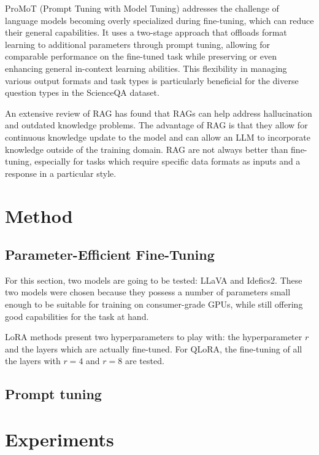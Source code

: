 \documentclass{article}
\begin{document}
ProMoT (Prompt Tuning with Model Tuning) \cite{valizadehaslani2022twostagefinetuningnovelstrategy} addresses the challenge of language models becoming overly specialized during fine-tuning, which can reduce their general capabilities. It uses a two-stage approach that offloads format learning to additional parameters through prompt tuning, allowing for comparable performance on the fine-tuned task while preserving or even enhancing general in-context learning abilities. This flexibility in managing various output formats and task types is particularly beneficial for the diverse question types in the ScienceQA dataset.

An extensive review of RAG \cite{ragreview} has found that RAGs can help address hallucination and outdated knowledge problems. The advantage of RAG is that they allow for continuous knowledge update to the model and can allow an LLM to incorporate knowledge outside of the training domain. RAG are not always better than fine-tuning, especially for tasks which require specific data formats as inputs and a response in a particular style.



\section{Method}
\label{sec:method}

\subsection{Parameter-Efficient Fine-Tuning}
For this section, two models are going to be tested: LLaVA\cite{liu2023llava} and Idefics2\cite{idefics2}. These
two models were chosen because they possess a number of parameters small enough to be suitable for training
on consumer-grade GPUs, while still offering good capabilities for the task at hand.

LoRA methods present two hyperparameters to play with: the hyperparameter $r$ and the layers which are actually
fine-tuned. For QLoRA, the fine-tuning of all the layers with $r=4$ and $r=8$ are tested.

\subsection{Prompt tuning}

\section{Experiments}
\label{sec:experiments}
\end{document}
